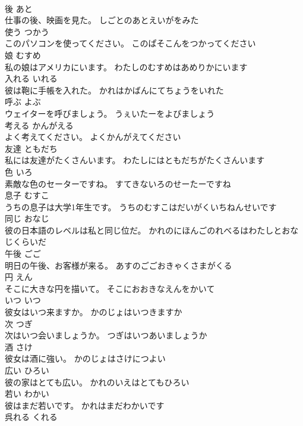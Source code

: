 \documentclass[8pt]{extreport}
\begin{document}
\begin{CJK}{UTF8}{min}
\\	後	あと	
\\	仕事の後、映画を見た。	しごとのあとえいがをみた	
\\	使う	つかう	
\\	このパソコンを使ってください。	このぱそこんをつかってください	
\\	娘	むすめ	
\\	私の娘はアメリカにいます。	わたしのむすめはあめりかにいます	
\\	入れる	いれる	
\\	彼は鞄に手帳を入れた。	かれはかばんにてちょうをいれた	
\\	呼ぶ	よぶ	
\\	ウェイターを呼びましょう。	うぇいたーをよびましょう	
\\	考える	かんがえる	
\\	よく考えてください。	よくかんがえてください	
\\	友達	ともだち	
\\	私には友達がたくさんいます。	わたしにはともだちがたくさんいます	
\\	色	いろ	
\\	素敵な色のセーターですね。	すてきないろのせーたーですね	
\\	息子	むすこ	
\\	うちの息子は大学1年生です。	うちのむすこはだいがくいちねんせいです	
\\	同じ	おなじ	
\\	彼の日本語のレベルは私と同じ位だ。	かれのにほんごのれべるはわたしとおなじくらいだ	
\\	午後	ごご	
\\	明日の午後、お客様が来る。	あすのごごおきゃくさまがくる	
\\	円	えん	
\\	そこに大きな円を描いて。	そこにおおきなえんをかいて	
\\	いつ	いつ	
\\	彼女はいつ来ますか。	かのじょはいつきますか	
\\	次	つぎ	
\\	次はいつ会いましょうか。	つぎはいつあいましょうか	
\\	酒	さけ	
\\	彼女は酒に強い。	かのじょはさけにつよい	
\\	広い	ひろい	
\\	彼の家はとても広い。	かれのいえはとてもひろい	
\\	若い	わかい	
\\	彼はまだ若いです。	かれはまだわかいです	
\\	呉れる	くれる	

\end{CJK}
\end{document}
